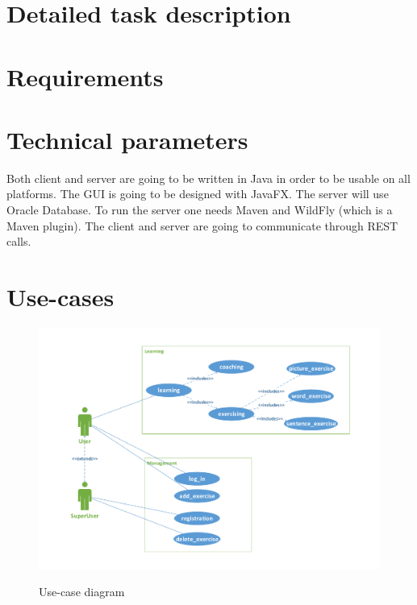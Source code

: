 \documentclass[a4paper]{article}
\begin{document}
	\section{Detailed task description}
	
	\section{Requirements}
	
	
	\section{Technical parameters}
	Both client and server are going to be written in Java in order to be usable on all platforms. The GUI is going to be designed with JavaFX. The server will use Oracle Database. To run the server one needs Maven and WildFly (which is a Maven plugin). The client and server are going to communicate through REST calls.
	
	\section{Use-cases}
	\begin{figure}[htbp]
		\center
		\resizebox{160mm}{!} {
			\includegraphics{figures/use-case.pdf}
		}
		\caption{Use-case diagram}
		\label{fig:use-case}
	\end{figure}

	
\end{document}

